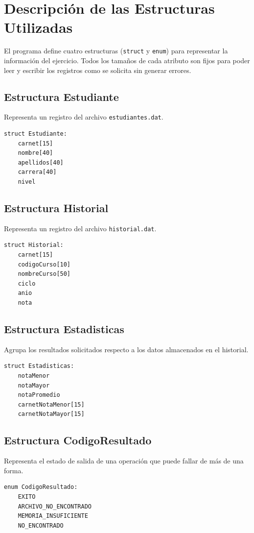 \documentclass[12pt,letterpaper]{article}
\begin{document}
\section{Descripción de las Estructuras Utilizadas}

El programa define cuatro estructuras (\texttt{struct} y \texttt{enum}) para representar la información del ejercicio.
Todos los tamaños de cada atributo son fijos para poder leer y escribir los registros como se solicita sin generar errores.

\subsection{Estructura Estudiante}
Representa un registro del archivo \texttt{estudiantes.dat}.

\begin{lstlisting}
struct Estudiante:
    carnet[15]
    nombre[40]
    apellidos[40]
    carrera[40]
    nivel
\end{lstlisting}

\subsection{Estructura Historial}
Representa un registro del archivo \texttt{historial.dat}.

\begin{lstlisting}
struct Historial:
    carnet[15]
    codigoCurso[10]
    nombreCurso[50]
    ciclo
    anio
    nota
\end{lstlisting}

\subsection{Estructura Estadisticas}
Agrupa los resultados solicitados respecto a los datos almacenados en el historial.

\begin{lstlisting}
struct Estadisticas:
    notaMenor
    notaMayor
    notaPromedio
    carnetNotaMenor[15]
    carnetNotaMayor[15]
\end{lstlisting}

\subsection{Estructura CodigoResultado}
Representa el estado de salida de una operación que puede fallar de más de una forma.

\begin{lstlisting}
enum CodigoResultado:
    EXITO
    ARCHIVO_NO_ENCONTRADO
    MEMORIA_INSUFICIENTE
    NO_ENCONTRADO
\end{lstlisting}
\end{document}
